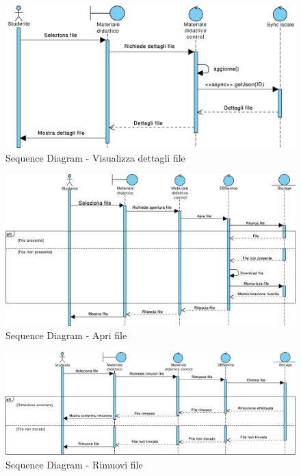 \begin{figure}
	\centering
	\includegraphics[width=6.5in]{imgs/gruppo1//sequence_diagrams/SD15_visualizza_dettagli_file.pdf}
	\caption{Sequence Diagram - Visualizza dettagli file}
	\label{diag:visualizzaDettagliFileSD}
\end{figure}

\begin{figure}
	\centering
	\includegraphics[width=6.5in]{imgs/gruppo1/sequence_diagrams/SD16_apri_file.pdf}
	\caption{Sequence Diagram - Apri file}
	\label{diag:apriFileSD}
\end{figure}
\newpage

\begin{figure}
	\centering
	\includegraphics[width=6.5in]{imgs/gruppo1/sequence_diagrams/SD17_rimuovi_file.pdf}
	\caption{Sequence Diagram - Rimuovi file}
	\label{diag:rimuoviFileSD}
\end{figure}

\clearpage